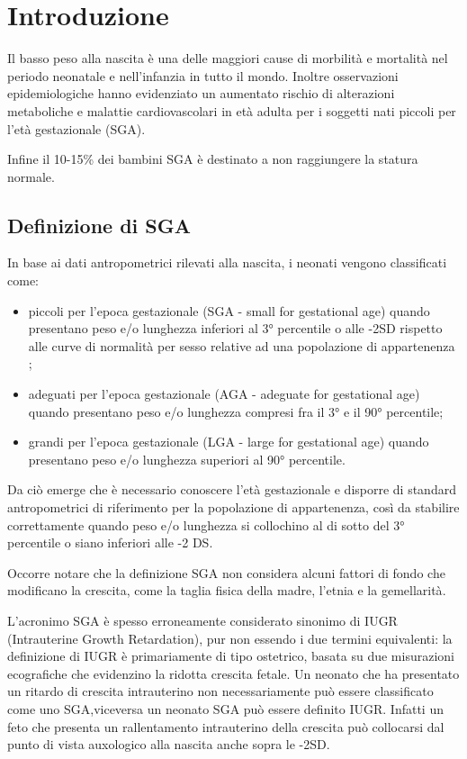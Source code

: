 \mainmatter

\chapter{Introduzione}
 
Il basso peso alla nascita \`e una delle maggiori cause di morbilit\`a e mortalit\`a
nel periodo neonatale e nell'infanzia in tutto il mondo.
Inoltre osservazioni epidemiologiche hanno evidenziato un aumentato rischio di 
alterazioni metaboliche e malattie cardiovascolari in età adulta per i soggetti nati piccoli 
per l'et\`a gestazionale (SGA)\cite{consensus}.

Infine il 10-15\% dei bambini SGA è destinato a non raggiungere la statura normale\cite{sga}.

\section{Definizione di SGA}

In base ai dati antropometrici rilevati alla nascita, i neonati vengono classificati come:
\begin{itemize}
\item piccoli per l'epoca gestazionale (SGA - small for gestational age) quando presentano peso e/o lunghezza inferiori al 3°
   percentile o alle -2SD rispetto alle curve di normalità per sesso relative ad una popolazione di appartenenza ;
\item adeguati per l'epoca gestazionale (AGA - adeguate for gestational age) quando presentano peso e/o lunghezza compresi
   fra il 3° e il 90° percentile;
\item grandi per l'epoca gestazionale (LGA - large for gestational age) quando presentano peso e/o lunghezza superiori
   al 90° percentile\cite{sga-1}.
\end{itemize}

Da ciò emerge che è necessario conoscere l'età gestazionale e disporre di standard antropometrici di riferimento per la popolazione di appartenenza, così da stabilire correttamente quando peso e/o lunghezza si collochino al di sotto del 3° percentile o siano inferiori alle -2 DS.

 Occorre notare che la definizione SGA non considera alcuni fattori di fondo che modificano la crescita, come la taglia fisica della madre,
l'etnia e la gemellarit\`a\cite{consensus}.

L'acronimo SGA è spesso erroneamente considerato sinonimo di IUGR (Intrauterine Growth Retardation), pur non essendo i due termini
equivalenti: la definizione di IUGR è primariamente di tipo ostetrico, basata su due misurazioni ecografiche che evidenzino la ridotta crescita fetale.
Un neonato che ha presentato un ritardo di crescita intrauterino non necessariamente pu\`o essere classificato come uno SGA,viceversa un
neonato SGA pu\`o essere definito IUGR. Infatti un feto che presenta un rallentamento intrauterino della crescita può collocarsi dal punto di vista 
auxologico alla nascita anche sopra le -2SD\cite{sga}.

